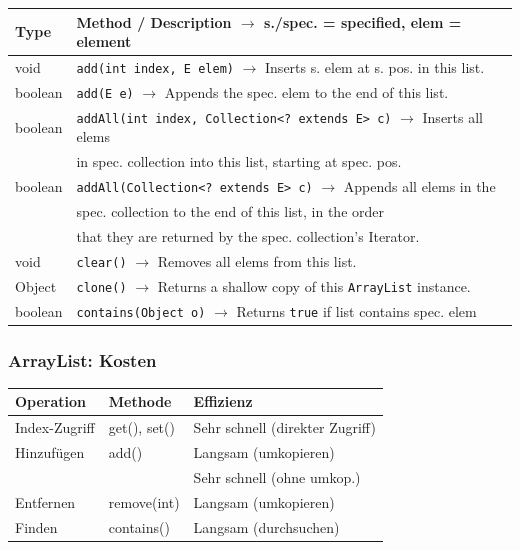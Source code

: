 {    {\scriptsize 
        \begin{tabular}{l l}
            \rowcolor[RGB]{239,239,239} 
            \textbf{Type} & \textbf{Method / Description} $\rightarrow$ s./spec. = specified, elem = element\\ \hline
            void                       & \texttt{add(int index, E elem)} $\rightarrow$ Inserts s. elem at s. pos. in this list. \\ \hline
            boolean                    & \texttt{add(E e)} $\rightarrow$ Appends the spec. elem to the end of this list. \\ \hline
            boolean                    & \texttt{addAll(int index, Collection<? extends E> c)} $\rightarrow$ Inserts all elems\\
            & in spec. collection into this list, starting at spec. pos. \\ \hline
            boolean                    & \texttt{addAll(Collection<? extends E> c)} $\rightarrow$ Appends all elems in the\\
            & spec. collection to the end of this list, in the order\\
            & that they are returned by the spec. collection's Iterator. \\ \hline
            void                       & \texttt{clear()} $\rightarrow$ Removes all elems from this list. \\ \hline
            Object                     & \texttt{clone()} $\rightarrow$ Returns a shallow copy of this \texttt{ArrayList} instance. \\ \hline
            boolean                    & \texttt{contains(Object o)} $\rightarrow$ Returns \texttt{true} if list contains spec. elem \\ \hline
        \end{tabular}}
    \vspace{-0.1cm}

    \subsubsection{ArrayList: Kosten}
        {\small
        \begin{tabular}{l l l} \hline
            \textbf{Operation} & \textbf{Methode} & \textbf{Effizienz} \\ \hline
            Index-Zugriff & get(), set() & \color{green!80!black}Sehr schnell (direkter Zugriff) \\
            Hinzufügen    & add()        & \color{red}Langsam (umkopieren) \\
                        &              & \color{green!80!black}Sehr schnell (ohne umkop.) \\
            Entfernen     & remove(int)  & \color{red}Langsam (umkopieren) \\
            Finden        & contains()   & \color{red}Langsam (durchsuchen) \\
        \end{tabular}}
        \vspace{-0.1cm}

}
